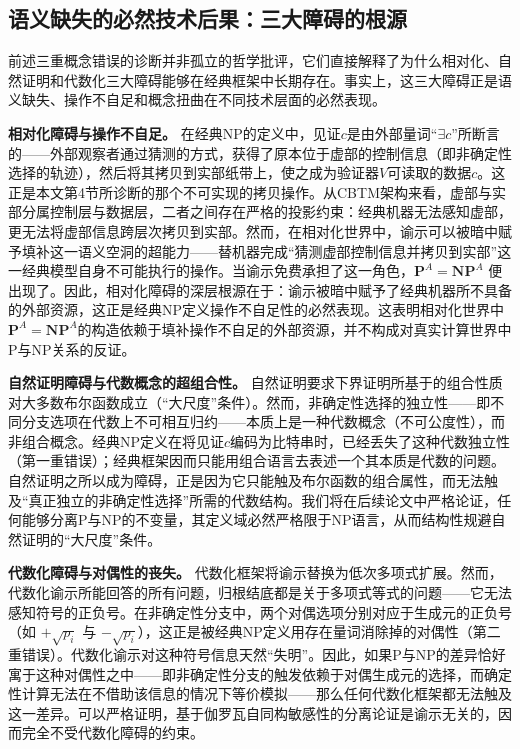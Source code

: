 \documentclass{ctexart}
\begin{document}
	\subsection{语义缺失的必然技术后果：三大障碍的根源} \label{sec:barriers-root}
	
	前述三重概念错误的诊断并非孤立的哲学批评，它们直接解释了为什么相对化、自然证明和代数化三大障碍能够在经典框架中长期存在。事实上，这三大障碍正是语义缺失、操作不自足和概念扭曲在不同技术层面的必然表现。
	
	\textbf{相对化障碍与操作不自足。} 在经典NP的定义中，见证$c$是由外部量词“$\exists c$”所断言的——外部观察者通过猜测的方式，获得了原本位于虚部的控制信息（即非确定性选择的轨迹），然后将其拷贝到实部纸带上，使之成为验证器$V$可读取的数据$c$。这正是本文第4节所诊断的那个不可实现的拷贝操作。从CBTM架构来看，虚部与实部分属控制层与数据层，二者之间存在严格的投影约束：经典机器无法感知虚部，更无法将虚部信息跨层次拷贝到实部。然而，在相对化世界中，谕示可以被暗中赋予填补这一语义空洞的超能力——替机器完成“猜测虚部控制信息并拷贝到实部”这一经典模型自身不可能执行的操作。当谕示免费承担了这一角色，$\mathbf{P}^A = \mathbf{NP}^A$ 便出现了。因此，相对化障碍的深层根源在于：谕示被暗中赋予了经典机器所不具备的外部资源，这正是经典NP定义操作不自足性的必然表现。这表明相对化世界中$\mathbf{P}^A=\mathbf{NP}^A$的构造依赖于填补操作不自足的外部资源，并不构成对真实计算世界中P与NP关系的反证。
	
	\textbf{自然证明障碍与代数概念的超组合性。} 自然证明要求下界证明所基于的组合性质对大多数布尔函数成立（“大尺度”条件）。然而，非确定性选择的独立性——即不同分支选项在代数上不可相互归约——本质上是一种代数概念（不可公度性），而非组合概念。经典NP定义在将见证$c$编码为比特串时，已经丢失了这种代数独立性（第一重错误）；经典框架因而只能用组合语言去表述一个其本质是代数的问题。自然证明之所以成为障碍，正是因为它只能触及布尔函数的组合属性，而无法触及“真正独立的非确定性选择”所需的代数结构。我们将在后续论文中严格论证，任何能够分离P与NP的不变量，其定义域必然严格限于NP语言，从而结构性规避自然证明的“大尺度”条件。
	
	\textbf{代数化障碍与对偶性的丧失。} 代数化框架将谕示替换为低次多项式扩展。然而，代数化谕示所能回答的所有问题，归根结底都是关于多项式等式的问题——它无法感知符号的正负号。在非确定性分支中，两个对偶选项分别对应于生成元的正负号（如 $+\sqrt{p_i}$ 与 $-\sqrt{p_i}$），这正是被经典NP定义用存在量词消除掉的对偶性（第二重错误）。代数化谕示对这种符号信息天然“失明”。因此，如果P与NP的差异恰好寓于这种对偶性之中——即非确定性分支的触发依赖于对偶生成元的选择，而确定性计算无法在不借助该信息的情况下等价模拟——那么任何代数化框架都无法触及这一差异。可以严格证明，基于伽罗瓦自同构敏感性的分离论证是谕示无关的，因而完全不受代数化障碍的约束。
	
\end{document}
